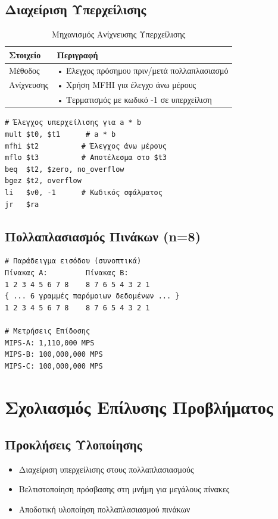 \documentclass[11pt,a4paper]{article}
\begin{document}
\subsection{Διαχείριση Υπερχείλισης}

\begin{table}[h]
\centering
\begin{tabular}{|l|p{11cm}|}
\hline
\textbf{Στοιχείο} & \textbf{Περιγραφή} \\
\hline
Μέθοδος & • Έλεγχος πρόσημου πριν/μετά πολλαπλασιασμό \\
Ανίχνευσης & • Χρήση MFHI για έλεγχο άνω μέρους \\
& • Τερματισμός με κωδικό -1 σε υπερχείλιση \\
\hline
\end{tabular}
\caption{Μηχανισμός Ανίχνευσης Υπερχείλισης}
\end{table}

\begin{lstlisting}[basicstyle=\footnotesize]
# Έλεγχος υπερχείλισης για a * b
mult $t0, $t1      # a * b
mfhi $t2          # Έλεγχος άνω μέρους
mflo $t3          # Αποτέλεσμα στο $t3
beq  $t2, $zero, no_overflow
bgez $t2, overflow
li   $v0, -1      # Κωδικός σφάλματος
jr   $ra
\end{lstlisting}

\subsection{Πολλαπλασιασμός Πινάκων (n=8)}
\begin{lstlisting}[basicstyle=\footnotesize]
# Παράδειγμα εισόδου (συνοπτικά)
Πίνακας A:         Πίνακας B:
1 2 3 4 5 6 7 8    8 7 6 5 4 3 2 1
{ ... 6 γραμμές παρόμοιων δεδομένων ... }
1 2 3 4 5 6 7 8    8 7 6 5 4 3 2 1

# Μετρήσεις Επίδοσης
MIPS-A: 1,110,000 MPS
MIPS-B: 100,000,000 MPS
MIPS-C: 100,000,000 MPS
\end{lstlisting}

\section{Σχολιασμός Επίλυσης Προβλήματος}
\subsection{Προκλήσεις Υλοποίησης}
\begin{itemize}
    \item Διαχείριση υπερχείλισης στους πολλαπλασιασμούς
    \item Βελτιστοποίηση πρόσβασης στη μνήμη για μεγάλους πίνακες
    \item Αποδοτική υλοποίηση πολλαπλασιασμού πινάκων
\end{itemize}
\end{document}
